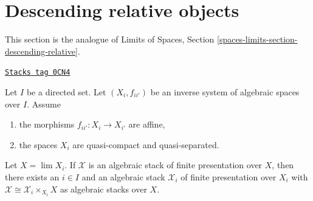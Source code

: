 \section{Descending relative objects}
\label{stacks-limits-section-descending-relative}
This section is the analogue of
Limits of Spaces, Section \ref{spaces-limits-section-descending-relative}.

\begin{lemma}
\label{stacks-limits-lemma-descend-a-stack-down}
\href{https://stacks.math.columbia.edu/tag/0CN4}{\texttt{Stacks tag 0CN4}}

Let $I$ be a directed set. Let $(X_i, f_{ii'})$ be an inverse system
of algebraic spaces over $I$. Assume
\begin{enumerate}
\item the morphisms $f_{ii'} : X_i \to X_{i'}$ are affine,
\item the spaces $X_i$ are quasi-compact and quasi-separated.
\end{enumerate}
Let $X = \lim X_i$.
If $\mathcal{X}$ is an algebraic stack of finite presentation over $X$,
then there exists an $i \in I$ and an algebraic stack $\mathcal{X}_i$
of finite presentation over $X_i$ with
$\mathcal{X} \cong \mathcal{X}_i \times_{X_i} X$ as
algebraic stacks over $X$.
\end{lemma}

